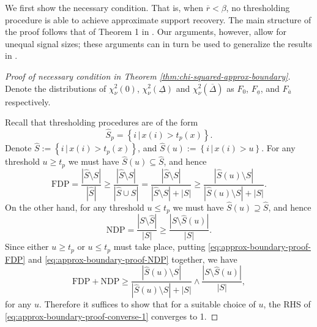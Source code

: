 We first show the necessary condition. 
That is, when $\overline{r} < \beta$, no thresholding procedure is able to achieve approximate support recovery.
The main structure of the proof follows that of Theorem 1 in \citet{arias2017distribution}. 
Our arguments, however, allow for unequal signal sizes; these arguments can in turn be used to generalize the results in \cite{arias2017distribution}.

\begin{proof}[Proof of necessary condition in Theorem \ref{thm:chi-squared-approx-boundary}]
Denote the distributions of $\chi^2_\nu(0)$, $\chi^2_\nu(\underline{\Delta})$ and $\chi^2_\nu(\overline{\Delta})$ as $F_0$, $F_{\underline{a}}$, and $F_{\overline{a}}$ respectively.


Recall that thresholding procedures are of the form
$$
\widehat{S}_p = \left\{i\,|\,x(i) > t_p(x)\right\}.
$$
Denote $\widehat{S} := \left\{i\,|\,x(i) > t_p(x)\right\}$, and $\widehat{S}(u) := \left\{i\,|\,x(i) > u\right\}$.
For any threshold $u\ge t_p$ we must have $\widehat{S}(u)\subseteq\widehat{S}$, and hence
\begin{equation} \label{eq:approx-boundary-proof-FDP}
    \text{FDP} = \frac{|\widehat{S}\setminus{S}|}{|\widehat{S}|} \ge \frac{|\widehat{S}\setminus{S}|}{|\widehat{S}\cup{S}|} = \frac{|\widehat{S}\setminus{S}|}{|\widehat{S}\setminus{S}| + |S|} \ge
    \frac{|\widehat{S}(u)\setminus{S}|}{|\widehat{S}(u)\setminus{S}| + |S|}.
\end{equation}
On the other hand, for any threshold $u\le t_p$ we must have $\widehat{S}(u)\supseteq\widehat{S}$, and hence
\begin{equation} \label{eq:approx-boundary-proof-NDP}
    \text{NDP} = \frac{|{S}\setminus\widehat{S}|}{|{S}|} \ge 
    \frac{|{S}\setminus\widehat{S}(u)|}{|{S}|}.
\end{equation}
Since either $u\ge t_p$ or  $u\le t_p$ must take place, putting \eqref{eq:approx-boundary-proof-FDP} and \eqref{eq:approx-boundary-proof-NDP} together, we have
\begin{equation} \label{eq:approx-boundary-proof-converse-1}
    \text{FDP} + \text{NDP} 
    \ge \frac{|\widehat{S}(u)\setminus{S}|}{|\widehat{S}(u)\setminus{S}|+|{S}|} \wedge \frac{|{S}\setminus\widehat{S}(u)|}{|{S}|},
\end{equation}
for any $u$.
Therefore it suffices to show that for a suitable choice of $u$, the RHS of \eqref{eq:approx-boundary-proof-converse-1} converges to 1.


\end{proof}
